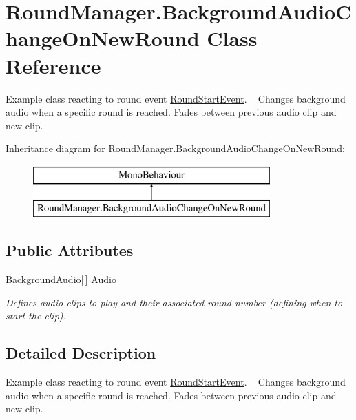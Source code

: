 \hypertarget{class_round_manager_1_1_background_audio_change_on_new_round}{}\section{Round\+Manager.\+Background\+Audio\+Change\+On\+New\+Round Class Reference}
\label{class_round_manager_1_1_background_audio_change_on_new_round}


Example class reacting to round event \hyperlink{class_round_manager_1_1_events_1_1_round_start_event}{Round\+Start\+Event}. ~\newline
Changes background audio when a specific round is reached. Fades between previous audio clip and new clip.  


Inheritance diagram for Round\+Manager.\+Background\+Audio\+Change\+On\+New\+Round\+:\begin{figure}[H]
\begin{center}
\leavevmode
\includegraphics[height=2.000000cm]{class_round_manager_1_1_background_audio_change_on_new_round}
\end{center}
\end{figure}
\subsection*{Public Attributes}
\begin{DoxyCompactItemize}
\item 
\hyperlink{class_round_manager_1_1_background_audio}{Background\+Audio}\mbox{[}$\,$\mbox{]} \hyperlink{class_round_manager_1_1_background_audio_change_on_new_round_ad7f96bc656537dedf4282c2be974fffd}{Audio}
\begin{DoxyCompactList}\small\item\em Defines audio clips to play and their associated round number (defining when to start the clip). \end{DoxyCompactList}\end{DoxyCompactItemize}


\subsection{Detailed Description}
Example class reacting to round event \hyperlink{class_round_manager_1_1_events_1_1_round_start_event}{Round\+Start\+Event}. ~\newline
Changes background audio when a specific round is reached. Fades between previous audio clip and new clip. 




